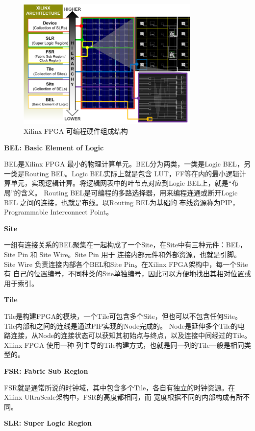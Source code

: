 \begin{figure}[h]
	\centering
	\includegraphics[width=0.8\textwidth]{figure/hierarchy}
	\caption{Xilinx FPGA 可编程硬件组成结构} 
	\label{fig:hierarchy}
\end{figure}

{\bf BEL: Basic Element of Logic}

BEL是Xilinx FPGA 最小的物理计算单元。BEL分为两类，一类是Logic BEL，另一类是Routing BEL。Logic BEL实际上就是包含
LUT，FF等在内的最小逻辑计算单元，实现逻辑计算。将逻辑网表中的叶节点对应到Logic BEL上，就是“布局”的含义。
Routing BEL是可编程的多路选择器，用来编程连通或断开Logic BEL 之间的连接，也就是布线。以Routing BEL为基础的
布线资源称为PIP，Programmable Interconnect Point。

{\bf Site}

一组有连接关系的BEL聚集在一起构成了一个Site，在Site中有三种元件：BEL，Site Pin 和 Site Wire。Site Pin 用于
连接内部元件和外部资源，也就是引脚。Site Wire 负责连接内部各个BEL和Site Pin。在Xilinx FPGA架构中，每一个Site有
自己的位置编号，不同种类的Site单独编号，因此可以方便地找出其相对位置或用于索引。

{\bf Tile}

Tile是构建FPGA的模块，一个Tile可包含多个Site，但也可以不包含任何Site。Tile内部和之间的连线是通过PIP实现的Node完成的。
Node是延伸多个Tile的电路连接，从Node的连接状态可以获知其初始点与终点，以及连接中间经过的Tile。Xilinx FPGA 使用一种
列主导的Tile构建方式，也就是同一列的Tile一般是相同类型的。

{\bf FSR: Fabric Sub Region}

FSR就是通常所说的时钟域，其中包含多个Tile，各自有独立的时钟资源。在Xilinx UltraScale架构中，FSR的高度都相同，而
宽度根据不同的内部构成有所不同。


{\bf SLR: Super Logic Region}

